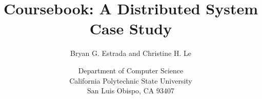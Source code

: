 \documentclass[11pt]{article}
\begin{document}
\title{Coursebook: A Distributed System Case Study}
\author{Bryan G. Estrada and Christine H. Le}
\date{Department of Computer Science\\
      California Polytechnic State University\\
      San Luis Obispo, CA  93407}
      
\begin{titlepage}
\maketitle\thispagestyle{empty}
\end{titlepage}

\doublespace
\tableofcontents
\newpage
\listoffigures
\newpage









\end{document}
